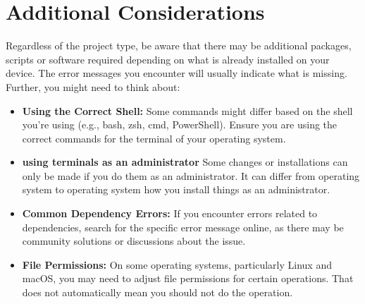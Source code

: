 \section*{Additional Considerations}
Regardless of the project type, be aware that there may be additional packages, scripts or software required
depending on what is already installed on your device.
The error messages you encounter will usually indicate what is missing. \\ \newline
Further, you might need to think about:
\begin{itemize}
    \item \textbf{Using the Correct Shell:} Some commands might differ based on the shell you’re using (e.g., bash, zsh, cmd, PowerShell).
    Ensure you are using the correct commands for the terminal of your operating system.  

    \item \textbf{using terminals as an administrator} Some changes or installations can only be made if you do them
    as an administrator.
    It can differ from operating system to operating system how you install things as an administrator.

    \item \textbf{Common Dependency Errors:} If you encounter errors related to dependencies, search for the specific error message online, as there may be community solutions or discussions about the issue.

    \item \textbf{File Permissions:}  On some operating systems, particularly Linux and macOS, you may need to adjust file permissions for certain operations.
    That does not automatically mean you should not do the operation.
\end{itemize}

